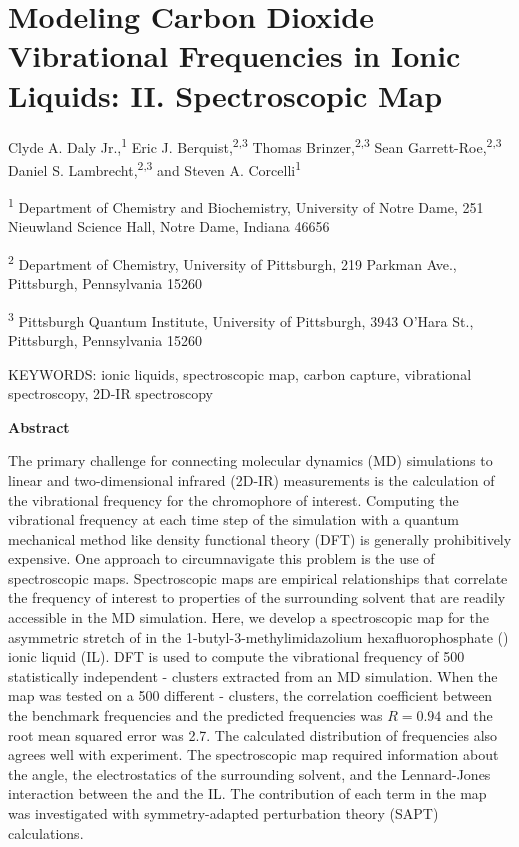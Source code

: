 \chapter[Spectroscopic Map]{Modeling Carbon Dioxide Vibrational Frequencies in Ionic Liquids: II. Spectroscopic Map}
\label{ch:paper_03}

Clyde A. Daly Jr.,\textsuperscript{1} Eric J. Berquist,\textsuperscript{2,3} Thomas Brinzer,\textsuperscript{2,3} Sean Garrett-Roe,\textsuperscript{2,3} Daniel S. Lambrecht,\textsuperscript{2,3} and Steven A. Corcelli\textsuperscript{1}

\textsuperscript{1} Department of Chemistry and Biochemistry, University of Notre Dame, 251 Nieuwland Science Hall, Notre Dame, Indiana 46656

\textsuperscript{2} Department of Chemistry, University of Pittsburgh, 219 Parkman Ave., Pittsburgh, Pennsylvania 15260

\textsuperscript{3} Pittsburgh Quantum Institute, University of Pittsburgh, 3943 O'Hara St., Pittsburgh, Pennsylvania 15260

KEYWORDS: ionic liquids, spectroscopic map, carbon capture, vibrational spectroscopy, 2D-IR spectroscopy

\textbf{Abstract}

The primary challenge for connecting molecular dynamics (MD) simulations to linear and two-dimensional infrared (2D-IR) measurements is the calculation of the vibrational frequency for the chromophore of interest. Computing the vibrational frequency at each time step of the simulation with a quantum mechanical method like density functional theory (DFT) is generally prohibitively expensive. One approach to circumnavigate this problem is the use of spectroscopic maps. Spectroscopic maps are empirical relationships that correlate the frequency of interest to properties of the surrounding solvent that are readily accessible in the MD simulation. Here, we develop a spectroscopic map for the asymmetric stretch of  in the 1-butyl-3-methylimidazolium hexafluorophosphate (\ce{[C4C1im][PF6]}) ionic liquid (IL). DFT is used to compute the vibrational frequency of \num{500} statistically independent -\ce{[C4C1im][PF6]} clusters extracted from an MD simulation. When the map was tested on a \num{500} different -\ce{[C4C1im][PF6]} clusters, the correlation coefficient between the benchmark frequencies and the predicted frequencies was \(R = 0.94\) and the root mean squared error was \SI{2.7}{\wavenumber}. The calculated distribution of frequencies also agrees well with experiment. The spectroscopic map required information about the  angle, the electrostatics of the surrounding solvent, and the Lennard-Jones interaction between the  and the IL. The contribution of each term in the map was investigated with symmetry-adapted perturbation theory (SAPT) calculations.

